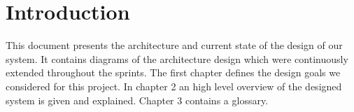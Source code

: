 \section{Introduction}
This document presents the architecture and current state of the design of our system. It contains diagrams of the architecture design which were continuously extended throughout the sprints. The first chapter defines the design goals we considered for this project. In chapter 2 an high level overview of the designed system is given and explained. Chapter 3 contains a glossary. 


